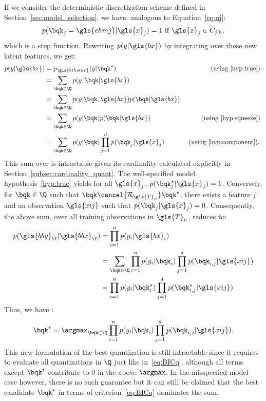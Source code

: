 If we consider the deterministic discretization scheme defined in Section~\ref{sec:model_selection}, we have, analogous to Equation~\eqref{eq:qj}:
$$
p(\bqk_j = \gls{ehmj} | \gls{x}_j) = 1 \text{ if } \gls{x}_j \in C_{j,h},
$$
which is a step function. Rewriting $p(y| \gls{bx})$ by integrating over these new latent features,
we get:
\begin{align*}
p(y | \gls{bx}) & = p_{\gls{bthstar}}(y | \bqk^\star) & \text{ (using \eqref{hyp:true}) } \\
& = \sum_{\bqk \in \Q} p(y, \bqk | \gls{bx}) \\
& = \sum_{\bqk \in \Q} p(y | \bqk, \gls{bx}) p(\bqk | \gls{bx}) \\
& = \sum_{\bqk \in \Q} p(y | \bqk) p(\bqk | \gls{bx}) & \text{ (using \eqref{hyp:squeeze}) } \\
& = \sum_{\bqk \in \Q} p(y | \bqk) \prod_{j=1}^d p(\bqk_j | \gls{x}_j) & \text{ (using \eqref{hyp:component}). }
\end{align*}
This sum over \Q is intractable given its cardinality calculated explicitly in Section~\ref{subsec:cardinality_quant}. The well-specified model hypothesis~\eqref{hyp:true} yields for all $\gls{x}_j$, $p(\bqk_j^\star | \gls{x}_j) = 1$. Conversely, for $\bqk \in \Q$ such that $\bqk \cancel{\mathcal{R}_{\gls{T}_n}} \bqk^\star$, there exists a feature $j$ and an observation $\gls{xij}$ such that $p(\bqk_j | \gls{x}_j) = 0$. Consequently, the above sum, over all training observations in $\gls{T}_n$, reduces to:
\begin{align*}
p(\gls{bby}_\f | \gls{bbx}_\f) & = \prod_{i=1}^n p(y_i | \gls{bx}_i) \\
 & = \sum_{\bqk \in \Q} \prod_{i=1}^n p(y_i | \bqk_i) \prod_{j=1}^d p(\bqk_{i,j} | \gls{xij}) \\
 & = \prod_{i=1}^n p(y_i | \bqk_i^\star) \prod_{j=1}^d p(\bqk_{i,j}^\star | \gls{xij})
\end{align*}
Thus, we have :
\[ \bqk^\star = \argmax_{\bqk \in \Q} \prod_{i=1}^n p(y_i | \bqk_i ) \prod_{j=1}^d p(\bqk_{i,j} | \gls{xij}). \]
This new formulation of the best quantization is still intractable since it requires to evaluate all quantizations in $\Q$ just like in~\eqref{eq:BICq}, although all terms except $\bqk^\star$ contribute to $0$ in the above $\argmax$. In the misspecfied model-case however, there is no such guarantee but it can still be claimed that the best candidate $\bqk^\star$ in terms of criterion~\eqref{eq:BICq} dominates the sum.

